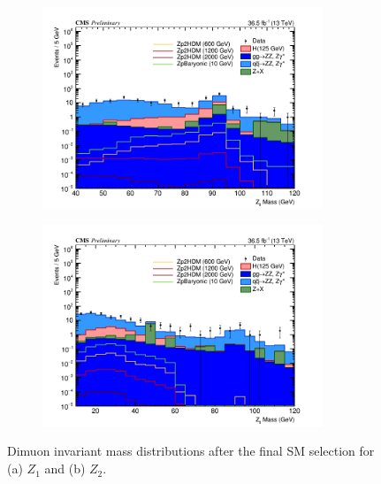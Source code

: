 \begin{figure}[tbh]
\begin{subfigure}{0.50\textwidth}
\centering
\includegraphics[width=3.3in]{figures/hist_hZ1mass_CR.png}
\caption{}
\end{subfigure}
\begin{subfigure}{0.50\textwidth}
\centering
\includegraphics[width=3.3in]{figures/hist_hZ2mass_CR.png}
\caption{}
\end{subfigure}
\caption{Dimuon invariant mass distributions after the final SM selection for (a) $Z_1$ and (b) $Z_2$.}
\label{fig:dimuonzmass}
\end{figure}

